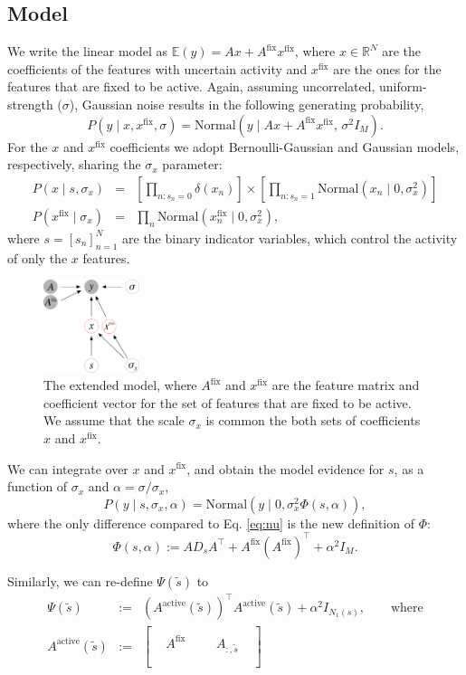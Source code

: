 \documentclass[letter,10pt,oneside]{article}
\newcommand{\be}{\begin{equation*}}
\newcommand{\ee}{\end{equation*}}
\newcommand{\ba}{\begin{eqnarray*}}
\newcommand{\ea}{\end{eqnarray*}}
\newcommand{\+}{^\dagger}
\newcommand{\T}{^\top}
\newcommand{\refeq}[1]{Eq. \ref{#1}}
\begin{document}
\subsection{Model}
We write the linear model as $\mathbb{E}(y) = Ax + A^\text{fix} x^\text{fix}$, where $x\in \mathds{R}^N$ are the coefficients of the features with uncertain activity and $x^\text{fix}$ are the ones for the features that are fixed to be active. Again, assuming uncorrelated, uniform-strength ($\sigma$), Gaussian noise results in the following generating probability,
\be
  P(y\;|\;x, x^\text{fix}, \sigma) = \text{Normal}(y\;|\;Ax + A^\text{fix}x^\text{fix}, \, \sigma^2 I_M).
\ee
For the $x$ and $x^\text{fix}$ coefficients we adopt Bernoulli-Gaussian and Gaussian models, respectively, sharing the $\sigma_x$ parameter:
\ba
  P(x\;|\;s, \sigma_x) &=& \left[\prod_{n: s_n = 0}\delta(x_n)\right] \times \left[\prod_{n: s_n=1} \text{Normal}(x_n\;|\;0, \sigma_x^2)\right] \\
  P(x^\text{fix}\;|\;\sigma_x) &=& \prod_n \text{Normal}(x_n^\text{fix}\;|\;0, \sigma_x^2),
\ea
where $s = [s_n]_{n=1}^N$ are the binary indicator variables, which control the activity of only the $x$ features.
\begin{figure}[h]
  \centering
  \includegraphics[width=0.25\textwidth]{figs/model-extension.pdf}
  \caption{
    \label{fig:model-extension}
    The extended model, where $A^\text{fix}$ and $x^\text{fix}$ are the feature matrix and coefficient vector for the set of features that are fixed to be active. We assume that the scale $\sigma_x$ is common the both sets of coefficients $x$ and $x^\text{fix}$.
    }
\end{figure}

We can integrate over $x$ and $x^\text{fix}$, and obtain the model evidence for $s$, as a function of $\sigma_x$ and $\alpha = \sigma/\sigma_x$,
\be
  P(y\;|\;s, \sigma_x, \alpha) = \text{Normal}(y\;|\;0, \sigma_x^2 \Phi(s,\alpha)),
\ee
where the only difference compared to \refeq{eq:nu} is the new definition of $\Phi$:
\be
  \Phi(s,\alpha) := AD_s A\T  + A^\text{fix} (A^\text{fix})\T + \alpha^2 I_M.
\ee

Similarly, we can re-define $\Psi(\tilde s)$ to
\ba
  \Psi(\tilde s) &:=& (A^\text{active}(\tilde s))\T A^\text{active}(\tilde s) + \alpha^2 I_{N_1(s)}, \qquad \text{where} \\
  A^\text{active}(\tilde s) &:=& 
  \left[\begin{array}{ccc|ccc}
  &&&&& \\
  & A^\text{fix} &&& A_{:, \tilde s} & \\
  &&&&& \\
  \end{array}\right]
\ea
\end{document}
